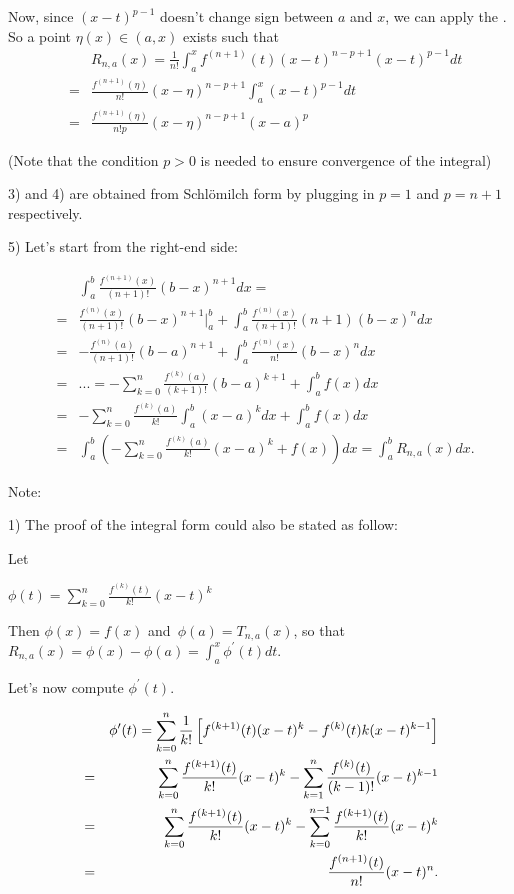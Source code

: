 \documentclass[12pt]{article}
\begin{document}
Now, since $(x-t)^{p-1}$ doesn't change sign between $a$ and $x$,
we can apply the . So a point $\eta (x)\in
(a,x)$ exists such that
\begin{eqnarray*}
&&R_{n,a}(x)=\frac{1}{n!}\int_{a}^{x}f^{(n+1)}(t)(x-t)^{n-p+1}(x-t)^{p-1}dt
\\
&=&\frac{f^{(n+1)}(\eta )}{n!}(x-\eta )^{n-p+1}\int_{a}^{x}(x-t)^{p-1}dt \\
&=&\frac{f^{(n+1)}(\eta )}{n!p}(x-\eta )^{n-p+1}(x-a)^{p}
\end{eqnarray*}

(Note that the condition $p>0$ is needed to ensure convergence of the
integral)

3) and 4) are obtained from Schl\"omilch form by plugging in $p=1$ and $p=n+1$
respectively.

5) Let's start from the right-end side:

\begin{eqnarray*}
&&\int_{a}^{b}\frac{f^{(n+1)}(x)}{(n+1)!}(b-x)^{n+1}dx= \\
&=&\frac{f^{(n)}(x)}{(n+1)!}(b-x)^{n+1}|_{a}^{b}+\int_{a}^{b}\frac{f^{(n)}(x)%
}{(n+1)!}(n+1)(b-x)^{n}dx \\
&=&-\frac{f^{(n)}(a)}{(n+1)!}(b-a)^{n+1}+\int_{a}^{b}\frac{f^{(n)}(x)}{n!}%
(b-x)^{n}dx \\
&=&...=-\sum_{k=0}^{n}\frac{f^{(k)}(a)}{(k+1)!}(b-a)^{k+1}+\int_{a}^{b}f(x)dx
\\
&=&-\sum_{k=0}^{n}\frac{f^{(k)}(a)}{k!}\int_{a}^{b}(x-a)^{k}dx+%
\int_{a}^{b}f(x)dx \\
&=&\int_{a}^{b}\left( -\sum_{k=0}^{n}\frac{f^{(k)}(a)}{k!}%
(x-a)^{k}+f(x)\right) dx=\int_{a}^{b}R_{n,a}(x)dx.
\end{eqnarray*}

Note:

1) The proof of the integral form could also be stated as follow:

Let 

$\phi (t)=\sum_{k=0}^{n}\frac{f^{(k)}(t)}{k!}(x-t)^{k}$

Then $\phi (x)=f(x)$ and\ $\phi (a)=T_{n,a}(x)$, so that $R_{n,a}(x)=\phi
(x)-\phi (a)=\int_{a}^{x}\phi ^{\prime }(t)dt.$

Let's now compute $\phi ^{\prime }(t).$

\begin{eqnarray*}
&&\phi ^{\prime }(t)=\sum_{k=0}^{n}\frac{1}{k!}\left[
f^{(k+1)}(t)(x-t)^{k}-f^{(k)}(t)k(x-t)^{k-1}\right] \\
&=&\sum_{k=0}^{n}\frac{f^{(k+1)}(t)}{k!}(x-t)^{k}-\sum_{k=1}^{n}\frac{%
f^{(k)}(t)}{(k-1)!}(x-t)^{k-1} \\
&=&\sum_{k=0}^{n}\frac{f^{(k+1)}(t)}{k!}(x-t)^{k}-\sum_{k=0}^{n-1}\frac{%
f^{(k+1)}(t)}{k!}(x-t)^{k} \\
&=&\frac{f^{(n+1)}(t)}{n!}(x-t)^{n}.
\end{eqnarray*}
\end{document}
